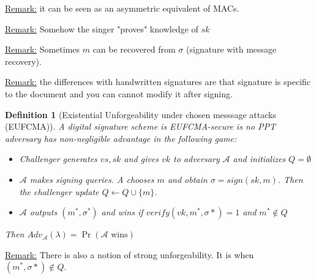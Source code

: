 \documentclass{article}
\newtheorem{defi}[thm]{Definition}
\newcommand{\Def}[3]{\begin{defi}[#1]\label{#2}#3\end{defi}}
\newcommand{\Rem}{\underline{Remark:} }
\newcommand{\A}{\mathcal{A}}
\begin{document}
\Rem it can be seen as an asymmetric equivalent of MACs. 

\Rem Somehow the singer "proves" knowledge of $sk$

\Rem Sometimes $m$ can be recovered from $\sigma$ (signature with message recovery).

\Rem the differences with handwritten signatures are that signature is specific to the document and you can cannot modify it after signing.

\Def{Existential Unforgeability under chosen messsage attacks (EUFCMA)}{def:EUFCMA}{A digital signature scheme is EUFCMA-secure is no PPT adversary has non-negligible advantage in the following game:\begin{itemize}
\item Challenger generates $vs,sk$ and gives $vk$ to adversary $\A$ and initializes $Q=\emptyset$
\item $\A$ makes signing queries. A chooses $m$ and obtain $\sigma=sign(sk,m)$. Then the challenger update $Q\leftarrow Q\cup\{m\}$.
\item $\A$ outputs $(m^*,\sigma^*)$ and wins if $verify(vk,m^*,\sigma*)=1$ and $m^*\notin Q$
\end{itemize}

Then $Adv_\A(\lambda)=\Pr(\A\text{ wins})$}

\Rem There is also a notion of strong unforgeability. It is when $(m^*,\sigma*)\notin Q$.
\end{document}
